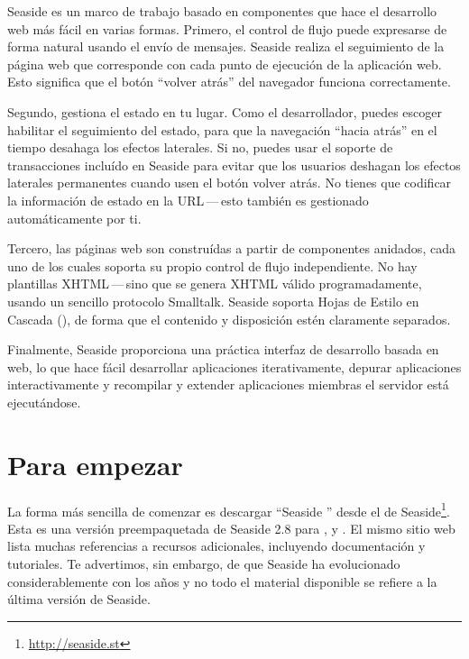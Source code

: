 \documentclass[a4paper,10pt,twoside]{book}
\begin{document}

Seaside es un marco de trabajo basado en componentes que hace el desarrollo web más fácil en varias formas.
Primero, el control de flujo puede expresarse de forma natural usando el envío de mensajes. Seaside realiza el seguimiento de la página web que corresponde con cada punto de ejecución de la aplicación web.
Esto significa que el botón ``volver atrás'' del navegador funciona correctamente.  

Segundo, gestiona el estado en tu lugar.
Como el desarrollador, puedes escoger habilitar el seguimiento del estado, para que la navegación ``hacia atrás'' en el tiempo desahaga los efectos laterales.
Si no, puedes usar el soporte de transacciones incluído en Seaside para evitar que los usuarios deshagan los efectos laterales permanentes cuando usen el botón volver atrás.
No tienes que codificar la información de estado en la URL\,---\,esto también es gestionado automáticamente por ti.

Tercero, las páginas web son construídas a partir de componentes anidados, cada uno de los cuales soporta su propio control de flujo independiente.
No hay plantillas XHTML\,---\,sino que se genera XHTML válido programadamente, usando un sencillo protocolo Smalltalk.
Seaside soporta Hojas de Estilo en Cascada (), de forma que el contenido y disposición estén claramente separados.

Finalmente, Seaside proporciona una práctica interfaz de desarrollo basada en web, lo que hace fácil desarrollar aplicaciones iterativamente, depurar aplicaciones interactivamente  y recompilar y extender aplicaciones miembras el servidor está ejecutándose.

\section{Para empezar}

La forma más sencilla de comenzar es descargar ``Seaside '' desde el  de Seaside\footnote{\url{http://seaside.st}}.
Esta es una versión preempaquetada de Seaside 2.8 para ,  y .
El mismo sitio web lista muchas referencias a recursos adicionales, incluyendo documentación y tutoriales.
Te advertimos, sin embargo, de que Seaside ha evolucionado considerablemente con los años y no todo el material disponible se refiere a la última versión de Seaside.
\end{document}

